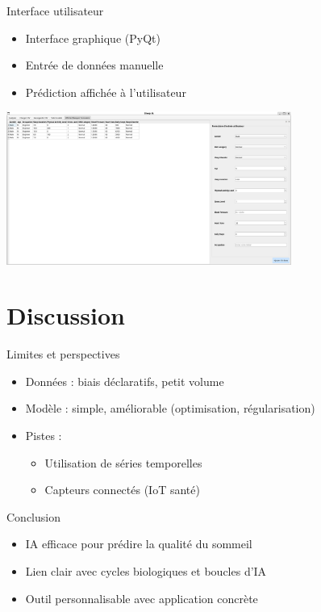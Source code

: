 \documentclass{beamer}
\begin{document}
\begin{frame}{Interface utilisateur}
  \begin{itemize}
    \item Interface graphique (PyQt)
    \item Entrée de données manuelle
    \item Prédiction affichée à l'utilisateur
  \end{itemize}
  \begin{center}
    \includegraphics[width=0.7\textwidth]{screen_UI.png}
  \end{center}
\end{frame}

\section{Discussion}

\begin{frame}{Limites et perspectives}
  \begin{itemize}
    \item Données : biais déclaratifs, petit volume
    \item Modèle : simple, améliorable (optimisation, régularisation)
    \item Pistes :
    \begin{itemize}
      \item Utilisation de séries temporelles
      \item Capteurs connectés (IoT santé)
    \end{itemize}
  \end{itemize}
\end{frame}

\begin{frame}{Conclusion}
  \begin{itemize}
    \item IA efficace pour prédire la qualité du sommeil
    \item Lien clair avec cycles biologiques et boucles d'IA
    \item Outil personnalisable avec application concrète
  \end{itemize}
  \vfill
\end{frame}
\end{document}
